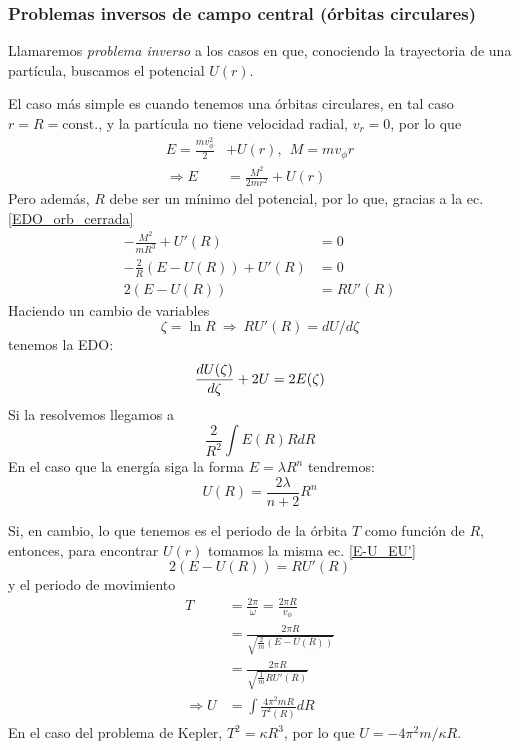 \documentclass[]{article}
\numberwithin{equation}{section}
\begin{document}
\subsubsection{Problemas inversos de campo central (órbitas circulares)}
Llamaremos \textit{problema inverso} a los casos en que, conociendo la trayectoria de una partícula, buscamos el potencial \(U(r)\).

El caso más simple es cuando tenemos una órbitas circulares, en tal caso \(r = R = \mathrm{const.}\), y la partícula no tiene velocidad radial, \(v_r = 0\), por lo que
\begin{align*}
	E = \frac{m v_\phi^2}{2}& + U(r), ~~M = m v_\phi r\\
	\Rightarrow E &= \frac{M^2}{2 m r^2} + U(r)
\end{align*}
Pero además, \(R\) debe ser un mínimo del potencial, por lo que, gracias a la ec. \ref{EDO_orb_cerrada}
\begin{align}
	-\frac{M^2}{m R^3} + U'(R) &= 0\nonumber\\
	-\frac{2}{R}\left(E - U(R)\right) + U'(R) &= 0\nonumber\\
	2\left(E - U(R)\right) &= R U'(R)\label{E-U_EU'}
\end{align}
Haciendo un cambio de variables
\begin{equation}
	\zeta = \ln R ~\Rightarrow~ R U'(R) = dU/d\zeta
\end{equation}
tenemos la EDO:
\begin{equation}
	\dfrac{d U(\zeta)}{d \zeta} + 2U = 2E(\zeta)
\end{equation}
Si la resolvemos llegamos a
\begin{equation}
	\frac{2}{R^2}\int E(R) R dR
\end{equation}
En el caso que la energía siga la forma \(E = \lambda R^n\) tendremos:
\begin{equation}
	U(R) = \frac{2 \lambda}{n + 2}R^n
\end{equation}

Si, en cambio, lo que tenemos es el periodo de la órbita \(T\) como función de \(R\), entonces, para encontrar \(U(r)\) tomamos la misma ec. \ref{E-U_EU'}
\begin{equation*}
	2\left(E - U(R)\right) = R U'(R)
\end{equation*}
y el periodo de movimiento
\begin{align}
	T &= \frac{2\pi}{\omega} = \frac{2 \pi R}{v_\phi}\nonumber\\
	&= \frac{2 \pi R}{\sqrt{\frac{2}{m} \left(E - U(R)\right)}}\nonumber\\
	&= \frac{2 \pi R}{\sqrt{\frac{1}{m} R U'(R)}}\nonumber\\
	\Rightarrow U &= \int \frac{4 \pi^2 m R}{T^2(R)} dR
\end{align}
En el caso del problema de Kepler, \(T^2 = \kappa R^3\), por lo que \(U = -4\pi^2 m /\kappa R\).
\end{document}
